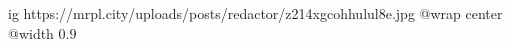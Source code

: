  
 
 
 
 

\ifcmt
  ig https://mrpl.city/uploads/posts/redactor/z214xgcohhulul8e.jpg
  @wrap center
  @width 0.9
\fi
